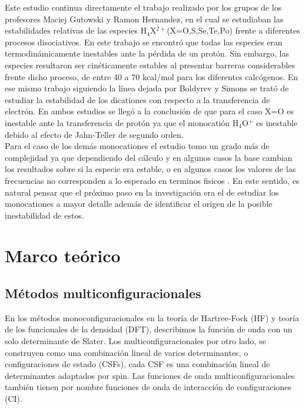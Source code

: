 \documentclass[12pt]{report}
\begin{document}
Este estudio continua directamente el trabajo realizado por los grupos de los profesores Maciej Gutowski y Ramon Hernandez\cite{Ramon}, en el cual se estudiaban las estabilidades relativas de las especies H$_4$X$^{2+}$(X=O,S,Se,Te,Po) frente a diferentes procesos disociativos. En este trabajo se encontró que todas las especies eran termodinámicamente inestables ante la pérdida de un protón. Sin embargo, las especies resultaron ser cinéticamente estables al presentar barreras considerables frente dicho proceso, de entre 40 a 70 kcal/mol para los diferentes calcógenos. En ese mismo trabajo siguiendo la línea dejada por Boldyrev y Simons\cite{Boldyrev1992} se trató de estudiar la estabilidad de los dicationes con respecto a la transferencia de electrón. En ambos estudios se llegó a la conclusión de que para el caso X=O  es inestable ante la transferencia de protón ya que el monocatión H$_4$O$^+$ es inestable debido al efecto de Jahn-Teller de segundo orden. 
\\


Para el caso de los demás monocationes el estudio tomo un grado más de complejidad ya que dependiendo del cálculo y en algunos casos la base cambian los resultados sobre si la especie era estable, o en algunos casos los valores de las frecuencias no corresponden a lo esperado en terminos fisicos . En este sentido, es natural pensar que el próximo paso en la investigación era el de estudiar los monocationes a mayor detalle además de identificar el origen de la posible inestabilidad de estos.

\newpage
\section{Marco teórico}

\subsection{Métodos multiconfiguracionales}

En los métodos monoconfiguracionales en la teoría de Hartree-Fock (HF) y teoría de los funcionales de la densidad (DFT), describimos la función de onda con un solo determinante de Slater. Los multiconfiguracionales por otro lado, se construyen como una combinación lineal de varios determinantes, o configuraciones de estado (CSFs), cada CSF es una combinación lineal de determinantes adaptados por spin. Las funciones de onda multiconfiguracionales también tienen por nombre funciones de onda de interacción de configuraciones (CI).
\\
\end{document}
